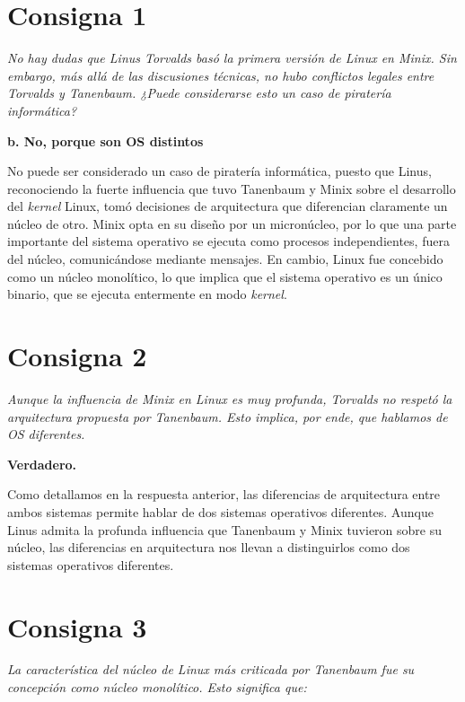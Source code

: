 \documentclass[11pt]{article}
\begin{document}


\pagebreak

\section*{Consigna 1}

\emph{No hay dudas que Linus Torvalds basó la primera versión de Linux en Minix.
Sin embargo, más allá de las discusiones técnicas, no hubo conflictos legales
entre Torvalds y Tanenbaum. ¿Puede considerarse esto un caso de piratería
informática?}

\textbf{b. No, porque son OS distintos}

No puede ser considerado un caso de piratería informática, puesto que Linus, 
reconociendo la fuerte influencia que tuvo Tanenbaum y Minix sobre el desarrollo
del \emph{kernel} Linux, tomó decisiones de arquitectura que diferencian
claramente un núcleo de otro. Minix opta en su diseño por un micronúcleo, por lo 
que una parte importante del sistema operativo se ejecuta como procesos
independientes, fuera del núcleo, comunicándose mediante mensajes. En cambio, 
Linux fue concebido como un núcleo monolítico, lo que implica que el sistema 
operativo es un único binario, que se ejecuta entermente en modo \emph{kernel}.

\section*{Consigna 2}

\emph{Aunque la influencia de Minix en Linux es muy profunda, Torvalds no
respetó la arquitectura propuesta por Tanenbaum. Esto implica, por ende, que
hablamos de OS diferentes.  }

\textbf{Verdadero.}

Como detallamos en la respuesta anterior, las diferencias de arquitectura entre 
ambos sistemas permite hablar de dos sistemas operativos diferentes. Aunque
Linus admita la profunda influencia que Tanenbaum y Minix tuvieron sobre su 
núcleo, las diferencias en arquitectura nos llevan a distinguirlos como dos
sistemas operativos diferentes.

\section*{Consigna 3}

\emph{ La característica del núcleo de Linux más criticada por Tanenbaum fue su
concepción como núcleo monolítico. Esto significa que: }
\end{document}
